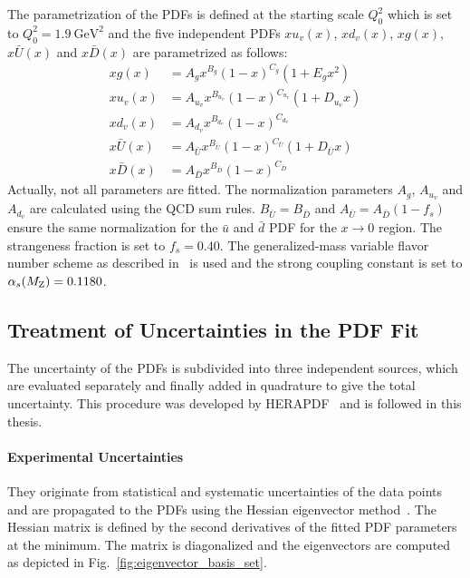 The parametrization of the PDFs is defined at the starting scale
$Q_0^2$ which is set to $Q_0^2 = \SI{1.9}{\GeV \squared}$ and the five
independent PDFs $xu_v(x)$, $xd_v(x)$, $xg(x)$, $x\bar{U}(x)$ and $x\bar{D}(x)$
are parametrized as follows:
%
\begin{align*}
  xg(x) &= A_g x^{B_g} (1-x)^{C_g} (1 + E_g x^2)\\
  xu_v(x) &= A_{u_{v}} x^{B_{u_{v}}} (1-x)^{C_{u_{v}}}(1 + D_{u_{v}}x)\\
  xd_v(x) &= A_{d_v} x^{B_{d_v}} (1-x)^{C_{d_{v}}}\\
  x\bar U(x) &= A_{\bar U} x^{B_{\bar U}} (1-x)^{C_{\bar U}}(1 + D_{\bar U}x)\\
  x\bar D(x) &= A_{\bar D} x^{B_{\bar D}} (1-x)^{C_{\bar D}}
\end{align*}
%
Actually, not all parameters are fitted. The normalization parameters $A_g$,
$A_{u_{v}}$ and $A_{d_{v}}$ are calculated using the QCD sum rules. $B_{\bar
U}=B_{\bar D}$ and $A_{\bar U} = A_{\bar D}(1-f_s)$ ensure the same
normalization for the $\bar u$ and $\bar d$ PDF for the $x \rightarrow 0$
region. The strangeness fraction is set to $f_s = 0.40$. The generalized-mass
variable flavor number scheme as described in~\cite{Thorne:1997ga,Thorne:2006qt}
is used and the strong coupling constant is set to $\alpha_{s}(M_\mathrm{Z})= 0.1180$.


\subsection{Treatment of Uncertainties in the PDF Fit}
\label{section:treatment_pdf_uncertainties}

The uncertainty of the PDFs is subdivided into three independent sources, which
are evaluated separately and finally added in quadrature to give the total
uncertainty. This procedure was developed by HERAPDF~\cite{Abramowicz:2015mha}
and is followed in this thesis.

\paragraph{Experimental Uncertainties} 
They originate from statistical and systematic uncertainties of the data
points and are propagated to the PDFs using the Hessian eigenvector
method~\cite{Pumplin:2001ct}. The Hessian matrix is defined by the second
derivatives of the fitted PDF parameters at the \chisq minimum. The matrix is
diagonalized and the eigenvectors are computed as depicted in
Fig.~\ref{fig:eigenvector_basis_set}. 

